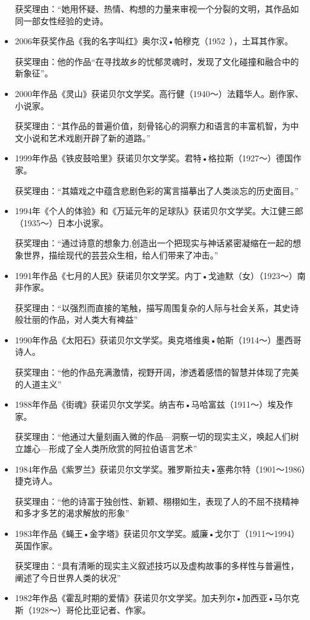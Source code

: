 \documentclass[UTF8,a4paper,8pt]{ctexart}
\begin{document}
\begin{itemize}
			获奖理由：“她用怀疑、热情、构想的力量来审视一个分裂的文明，其作品如同一部女性经验的史诗。
			\item 2006年获奖作品《我的名字叫红》奥尔汉•帕穆克（1952~），土耳其作家。
			
			获奖理由：他的作品“在寻找故乡的忧郁灵魂时，发现了文化碰撞和融合中的新象征”。
			\item 2000年作品《灵山》获诺贝尔文学奖。高行健（1940～）法籍华人。剧作家、小说家。
			
			获奖理由：“其作品的普遍价值，刻骨铭心的洞察力和语言的丰富机智，为中文小说和艺术戏剧开辟了新的道路。”
			\item 1999年作品《铁皮鼓哈里》获诺贝尔文学奖。君特•格拉斯（1927～）德国作家。
			
			获奖理由：“其嬉戏之中蕴含悲剧色彩的寓言描摹出了人类淡忘的历史面目。”
			
			\item 1994年《个人的体验》和《万延元年的足球队》获诺贝尔文学奖。大江健三郎（1935～）日本小说家。
			
			获奖理由：“通过诗意的想象力,创造出一个把现实与神话紧密凝缩在一起的想象世界，描绘现代的芸芸众生相，给人们带来了冲击。”
			\item 1991年作品《七月的人民》获诺贝尔文学奖。内丁•戈迪默（女）（1923～）南非作家。
			
			获奖理由：“以强烈而直接的笔触，描写周围复杂的人际与社会关系，其史诗般壮丽的作品，对人类大有裨益”
			\item 1990年作品《太阳石》获诺贝尔文学奖。奥克塔维奥•帕斯（1914～）墨西哥诗人。
			
			获奖理由：“他的作品充满激情，视野开阔，渗透着感悟的智慧并体现了完美的人道主义”
			\item 1988年作品《街魂》获诺贝尔文学奖。纳吉布•马哈富兹（1911～）埃及作家。
			
			获奖理由：“他通过大量刻画入微的作品—洞察一切的现实主义，唤起人们树立雄心—形成了全人类所欣赏的阿拉伯语言艺术”
			\item 1984年作品《紫罗兰》获诺贝尔文学奖。雅罗斯拉夫•塞弗尔特（1901～1986）捷克诗人。
			
			获奖理由：“他的诗富于独创性、新颖、栩栩如生，表现了人的不屈不挠精神和多才多艺的渴求解放的形象”
			\item 1983年作品《蝇王•金字塔》获诺贝尔文学奖。威廉•戈尔丁（1911～1994）英国作家。
			
			获奖理由：“具有清晰的现实主义叙述技巧以及虚构故事的多样性与普遍性，阐述了今日世界人类的状况”
			\item 1982年作品《霍乱时期的爱情》获诺贝尔文学奖。加夫列尔•加西亚•马尔克斯（1928～）哥伦比亚记者、作家。
			

\end{itemize}
\end{document}
